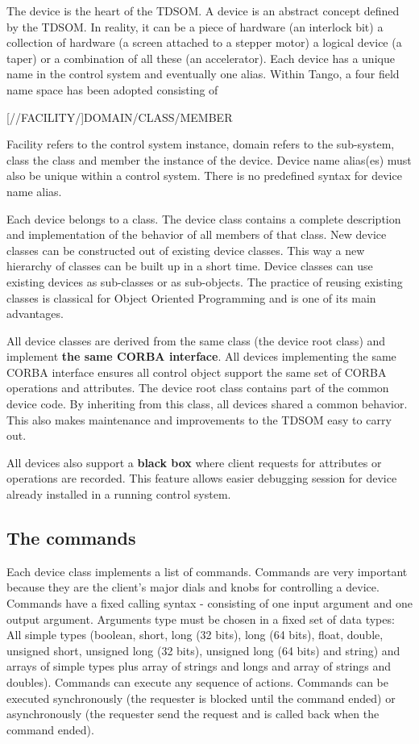 The device is the heart of the TDSOM. A device is an abstract concept
defined by the TDSOM. In reality, it can be a piece of hardware (an
interlock bit) a collection of hardware (a screen attached to a stepper
motor) a logical device (a taper) or a combination of all these (an
accelerator). Each device has a unique name in the control system
and eventually one alias. Within Tango, a four field
name space has been adopted consisting of \begin{center}{[}//FACILITY/{]}DOMAIN/CLASS/MEMBER\end{center}
Facility refers to the control system instance, domain refers to the
sub-system, class the class and member the instance of the device.
Device name alias(es) must also be unique within a control system.
There is no predefined syntax for device name alias.

Each device belongs to a class. The device class contains a complete
description and implementation of the behavior of all members of that
class. New device classes can be constructed out of existing device
classes. This way a new hierarchy of classes can be built up in a
short time. Device classes can use existing devices as sub-classes
or as sub-objects. The practice of reusing existing classes is classical
for Object Oriented Programming and is one of its main advantages.

All device classes are derived from the same class (the device root
class) and implement \textbf{the same CORBA interface}. All devices
implementing the same CORBA interface ensures all control object support
the same set of CORBA operations and attributes. The device root class
contains part of the common device code. By inheriting from this class,
all devices shared a common behavior. This also makes maintenance
and improvements to the TDSOM easy to carry out.

All devices also support a \textbf{black box} where
client requests for attributes or operations are recorded. This feature
allows easier debugging session for device already installed in a
running control system.

\subsection{The commands}

Each device class implements a list of commands. Commands are very
important because they are the client's major dials and knobs for
controlling a device. Commands have a fixed calling syntax - consisting
of one input argument and one output argument. Arguments type must
be chosen in a fixed set of data types: All simple types (boolean,
short, long (32 bits), long (64 bits), float, double, unsigned short,
unsigned long (32 bits), unsigned long (64 bits) and string) and arrays
of simple types plus array of strings and longs and array of strings
and doubles). Commands can execute any sequence of actions. Commands
can be executed synchronously (the requester is blocked until the
command ended) or asynchronously (the requester send the request and
is called back when the command ended).

